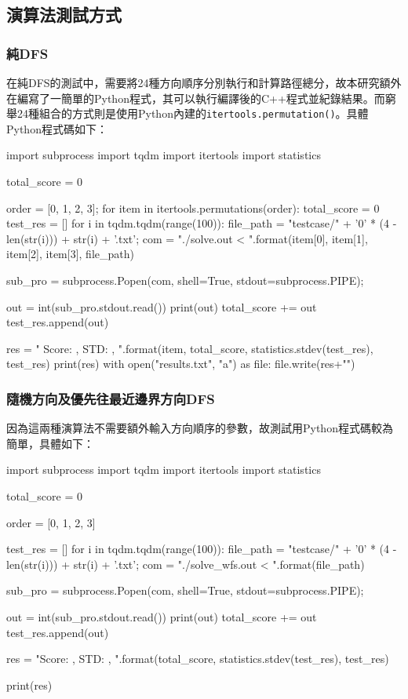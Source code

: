 \documentclass[12pt, a4paper]{article}
\newenvironment{code}{\captionsetup{type=listing}}{}
\begin{document}
\subsection{演算法測試方式}
\subsubsection{純DFS}
在純DFS的測試中，需要將24種方向順序分別執行和計算路徑總分，故本研究額外在編寫了一簡單的Python程式，其可以執行編譯後的C++程式並紀錄結果。而窮舉24種組合的方式則是使用Python內建的\texttt{itertools.permutation()}。具體Python程式碼如下：
\begin{code}
\begin{mintedPython}
import subprocess
import tqdm
import itertools
import statistics

total_score = 0

order = [0, 1, 2, 3];
for item in itertools.permutations(order):
    total_score = 0
    test_res = []
    for i in tqdm.tqdm(range(100)):
        file_path = "testcase/" + '0' * (4 - len(str(i))) + str(i) + '.txt';
        com = "./solve.out {} {} {} {} < {}".format(item[0], item[1], item[2], item[3], file_path)

        sub_pro = subprocess.Popen(com, shell=True, stdout=subprocess.PIPE);
        
        out = int(sub_pro.stdout.read())
        print(out)
        total_score += out
        test_res.append(out)

    res = "{} Score: {}, STD: {}, {}".format(item, total_score, statistics.stdev(test_res), test_res)
    print(res)
    with open("results.txt", "a") as file:
        file.write(res+"\n")
\end{mintedPython}
\end{code}
\subsubsection{隨機方向及優先往最近邊界方向DFS}
因為這兩種演算法不需要額外輸入方向順序的參數，故測試用Python程式碼較為簡單，具體如下：

\begin{code}
\begin{mintedPython}
import subprocess
import tqdm
import itertools
import statistics

total_score = 0

order = [0, 1, 2, 3]

test_res = []
for i in tqdm.tqdm(range(100)):
    file_path = "testcase/" + '0' * (4 - len(str(i))) + str(i) + '.txt';
    com = "./solve_wfs.out < {}".format(file_path)

    sub_pro = subprocess.Popen(com, shell=True, stdout=subprocess.PIPE);
    
    out = int(sub_pro.stdout.read())
    print(out)
    total_score += out
    test_res.append(out)

res = "Score: {}, STD: {}, {}".format(total_score, statistics.stdev(test_res), test_res)

print(res)
\end{mintedPython}
\end{code}
\end{document}
